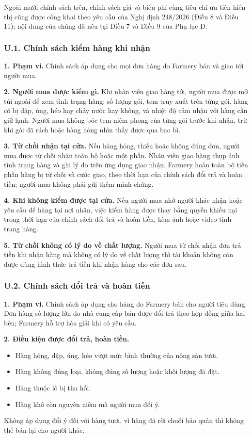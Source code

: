 Ngoài mười chính sách trên, chính sách giá và biểu phí cùng tiêu chí ưu tiên
hiển thị cũng được công khai theo yêu cầu của Nghị định 248/2026 (Điều 8 và
Điều 11); nội dung của chúng đã nêu tại Điều 7 và Điều 9 của Phụ lục D.

\subsubsection*{U.1. Chính sách kiểm hàng khi nhận}

\noindent\textbf{1. Phạm vi.} Chính sách áp dụng cho mọi đơn hàng do Farmery
bán và giao tới người mua.

\noindent\textbf{2. Người mua được kiểm gì.} Khi nhân viên giao hàng tới, người
mua được mở túi ngoài để xem tình trạng hàng: số lượng gói, tem truy xuất trên
từng gói, hàng có bị dập, úng, héo hay chảy nước hay không, và nhiệt độ cảm
nhận với hàng cần giữ lạnh. Người mua không bóc tem niêm phong của từng gói
trước khi nhận, trừ khi gói đã rách hoặc hàng hỏng nhìn thấy được qua bao bì.

\noindent\textbf{3. Từ chối nhận tại cửa.} Nếu hàng hỏng, thiếu hoặc không đúng
đơn, người mua được từ chối nhận toàn bộ hoặc một phần. Nhân viên giao hàng
chụp ảnh tình trạng hàng và ghi lý do trên ứng dụng giao nhận. Farmery hoàn
toàn bộ tiền phần hàng bị từ chối và cước giao, theo thời hạn của chính sách
đổi trả và hoàn tiền; người mua không phải gửi thêm minh chứng.

\noindent\textbf{4. Khi không kiểm được tại cửa.} Nếu người mua nhờ người khác
nhận hoặc yêu cầu để hàng tại nơi nhận, việc kiểm hàng được thay bằng quyền
khiếu nại trong thời hạn của chính sách đổi trả và hoàn tiền, kèm ảnh hoặc
video tình trạng hàng.

\noindent\textbf{5. Từ chối không có lý do về chất lượng.} Người mua từ chối
nhận đơn trả tiền khi nhận hàng mà không có lý do về chất lượng thì tài khoản
không còn được dùng hình thức trả tiền khi nhận hàng cho các đơn sau.

\subsubsection*{U.2. Chính sách đổi trả và hoàn tiền}

\noindent\textbf{1. Phạm vi.} Chính sách áp dụng cho hàng do Farmery bán cho
người tiêu dùng. Đơn hàng số lượng lớn do nhà cung cấp bán được đổi trả theo
hợp đồng giữa hai bên; Farmery hỗ trợ hòa giải khi có yêu cầu.

\noindent\textbf{2. Điều kiện được đổi trả, hoàn tiền.}
\begin{itemize}
    \item Hàng hỏng, dập, úng, héo vượt mức bình thường của nông sản tươi.
    \item Hàng không đúng loại, không đúng số lượng hoặc khối lượng đã đặt.
    \item Hàng thuộc lô bị thu hồi.
    \item Hàng khô còn nguyên niêm mà người mua đổi ý.
\end{itemize}
Không áp dụng đổi ý đối với hàng tươi, vì hàng đã rời chuỗi bảo quản thì không
thể bán lại cho người khác.

